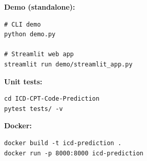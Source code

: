 \documentclass[11pt,a4paper]{article}
\begin{document}
\textbf{Demo (standalone):}
\begin{verbatim}
# CLI demo
python demo.py

# Streamlit web app
streamlit run demo/streamlit_app.py
\end{verbatim}

\textbf{Unit tests:}
\begin{verbatim}
cd ICD-CPT-Code-Prediction
pytest tests/ -v
\end{verbatim}

\textbf{Docker:}
\begin{verbatim}
docker build -t icd-prediction .
docker run -p 8000:8000 icd-prediction
\end{verbatim}
\end{document}
